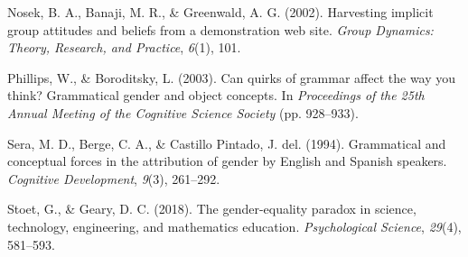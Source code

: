 \documentclass[man]{apa6}
\theoremstyle{definition}
\theoremstyle{definition}
\theoremstyle{definition}
\theoremstyle{remark}
\begin{document}
\hypertarget{ref-nosek2002harvesting}{}
Nosek, B. A., Banaji, M. R., \& Greenwald, A. G. (2002). Harvesting
implicit group attitudes and beliefs from a demonstration web site.
\emph{Group Dynamics: Theory, Research, and Practice}, \emph{6}(1), 101.

\hypertarget{ref-phillips2003can}{}
Phillips, W., \& Boroditsky, L. (2003). Can quirks of grammar affect the
way you think? Grammatical gender and object concepts. In
\emph{Proceedings of the 25th Annual Meeting of the Cognitive Science
Society} (pp. 928--933).

\hypertarget{ref-sera1994grammatical}{}
Sera, M. D., Berge, C. A., \& Castillo Pintado, J. del. (1994).
Grammatical and conceptual forces in the attribution of gender by
English and Spanish speakers. \emph{Cognitive Development}, \emph{9}(3),
261--292.

\hypertarget{ref-stoet2018gender}{}
Stoet, G., \& Geary, D. C. (2018). The gender-equality paradox in
science, technology, engineering, and mathematics education.
\emph{Psychological Science}, \emph{29}(4), 581--593.

\endgroup
\end{document}
